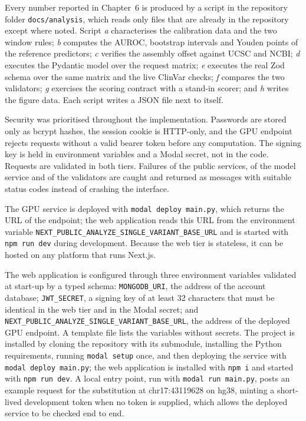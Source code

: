 Every number reported in Chapter~6 is produced by a script in the repository folder \texttt{docs/analysis}, which reads only files that are already in the repository except where noted. Script \textit{a} characterises the calibration data and the two window rules; \textit{b} computes the AUROC, bootstrap intervals and Youden points of the reference predictors; \textit{c} verifies the assembly offset against UCSC and NCBI; \textit{d} executes the Pydantic model over the request matrix; \textit{e} executes the real Zod schema over the same matrix and the live ClinVar checks; \textit{f} compares the two validators; \textit{g} exercises the scoring contract with a stand-in scorer; and \textit{h} writes the figure data. Each script writes a JSON file next to itself.

Security was prioritised throughout the implementation. Passwords are stored only as bcrypt hashes, the session cookie is HTTP-only, and the GPU endpoint rejects requests without a valid bearer token before any computation. The signing key is held in environment variables and a Modal secret, not in the code. Requests are validated in both tiers. Failures of the public services, of the model service and of the validators are caught and returned as messages with suitable status codes instead of crashing the interface.

The GPU service is deployed with \texttt{modal deploy main.py}, which returns the URL of the endpoint; the web application reads this URL from the environment variable \texttt{NEXT\_PUBLIC\_ANALYZE\_SINGLE\_VARIANT\_BASE\_URL} and is started with \texttt{npm run dev} during development. Because the web tier is stateless, it can be hosted on any platform that runs Next.js.

The web application is configured through three environment variables validated at start-up by a typed schema: \texttt{MONGODB\_URI}, the address of the account database; \texttt{JWT\_SECRET}, a signing key of at least 32 characters that must be identical in the web tier and in the Modal secret; and \texttt{NEXT\_PUBLIC\_ANALYZE\_SINGLE\_VARIANT\_BASE\_URL}, the address of the deployed GPU endpoint. A template file lists the variables without secrets. The project is installed by cloning the repository with its submodule, installing the Python requirements, running \texttt{modal setup} once, and then deploying the service with \texttt{modal deploy main.py}; the web application is installed with \texttt{npm i} and started with \texttt{npm run dev}. A local entry point, run with \texttt{modal run main.py}, posts an example request for the substitution at chr17:43119628 on hg38, minting a short-lived development token when no token is supplied, which allows the deployed service to be checked end to end.

